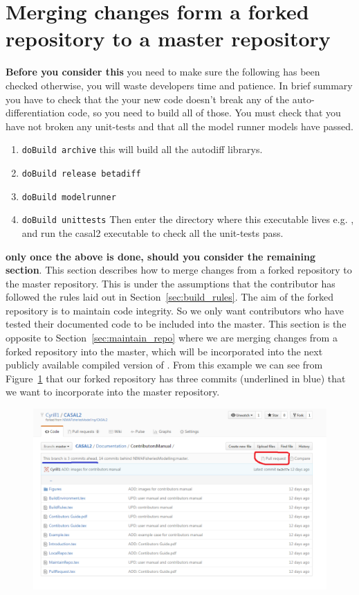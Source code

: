 \section{Merging changes form a forked repository to a master repository\label{sec:pull_requests}}

\textbf{Before you consider this} you need to make sure the following has been checked otherwise, you will waste developers time and patience. In brief summary you have to check that the your new code doesn't break any of the auto-differentiation code, so you need to build all of those. You must check that you have not broken any unit-tests and that all the model runner models have passed.

\begin{enumerate}
\item \texttt{doBuild archive} this will build all the autodiff librarys.
\item \texttt{doBuild release betadiff}
\item \texttt{doBuild modelrunner}
\item \texttt{doBuild unittests} Then enter the directory where this executable lives e.g. , and run the casal2 executable to check all the unit-tests pass.
			
\end{enumerate}


\textbf{only once the above is done, should you consider the remaining section}. This section describes how to merge changes from a forked repository to the master repository. This is under the assumptions that the contributor has followed the rules laid out in Section~\ref{sec:build_rules}. The aim of the forked repository is to maintain code integrity. So we only want contributors who have tested their documented code to be included into the master. This section is the opposite to Section~\ref{sec:maintain_repo} where we are merging changes from a forked repository into the master, which will be incorporated into the next publicly available compiled version of \CNAME. From this example we can see from Figure~\ref{fig:fork_merge} that our forked repository has three commits (underlined in blue) that we want to incorporate into the master repository.

\begin{figure}[!ht]
	\includegraphics[scale=0.6]{Figures/Pull_request0.png}
	\caption{}\label{fig:fork_merge}
\end{figure}

